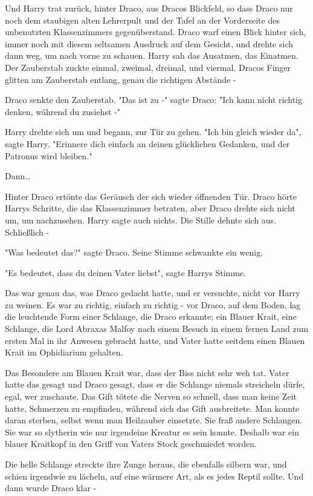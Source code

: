 {Und Harry trat zurück, hinter Draco, aus Dracos Blickfeld, so dass Draco nur noch dem staubigen alten Lehrerpult und der Tafel an der Vorderseite des unbenutzten Klassenzimmers gegenüberstand. Draco warf einen Blick hinter sich, immer noch mit diesem seltsamen Ausdruck auf dem Gesicht, und drehte sich dann weg, um nach vorne zu schauen. Harry sah das Ausatmen, das Einatmen. Der Zauberstab zuckte einmal, zweimal, dreimal, und viermal. Dracos Finger glitten am Zauberstab entlang, genau die richtigen Abstände -

Draco senkte den Zauberstab. "Das ist zu -" sagte Draco: "Ich kann nicht richtig denken, während du zusiehst -"

Harry drehte sich um und begann, zur Tür zu gehen. "Ich bin gleich wieder da", sagte Harry. "Erinnere dich einfach an deinen glücklichen Gedanken, und der Patronus wird bleiben."

Dann…

Hinter Draco ertönte das Geräusch der sich wieder öffnenden Tür. Draco hörte Harrys Schritte, die das Klassenzimmer betraten, aber Draco drehte sich nicht um, um nachzusehen. Harry sagte auch nichts. Die Stille dehnte sich aus. Schließlich -

"Was bedeutet das?" sagte Draco. Seine Stimme schwankte ein wenig.

"Es bedeutet, dass du deinen Vater liebst", sagte Harrys Stimme.

Das war genau das, was Draco gedacht hatte, und er versuchte, nicht vor Harry zu weinen. Es war zu richtig, einfach zu richtig - vor Draco, auf dem Boden, lag die leuchtende Form einer Schlange, die Draco erkannte; ein Blauer Krait, eine Schlange, die Lord Abraxas Malfoy nach einem Besuch in einem fernen Land zum ersten Mal in ihr Anwesen gebracht hatte, und Vater hatte seitdem einen Blauen Krait im Ophidiarium gehalten.

Das Besondere am Blauen Krait war, dass der Biss nicht sehr weh tat. Vater hatte das gesagt und Draco gesagt, dass er die Schlange niemals streicheln dürfe, egal, wer zuschaute. Das Gift tötete die Nerven so schnell, dass man keine Zeit hatte, Schmerzen zu empfinden, während sich das Gift ausbreitete. Man konnte daran sterben, selbst wenn man Heilzauber einsetzte. Sie fraß andere Schlangen. Sie war so slytherin wie nur irgendeine Kreatur es sein konnte. Deshalb war ein blauer Kraitkopf in den Griff von Vaters Stock geschmiedet worden.

Die helle Schlange streckte ihre Zunge heraus, die ebenfalls silbern war, und schien irgendwie zu lächeln, auf eine wärmere Art, als es jedes Reptil sollte. Und dann wurde Draco klar -

}

